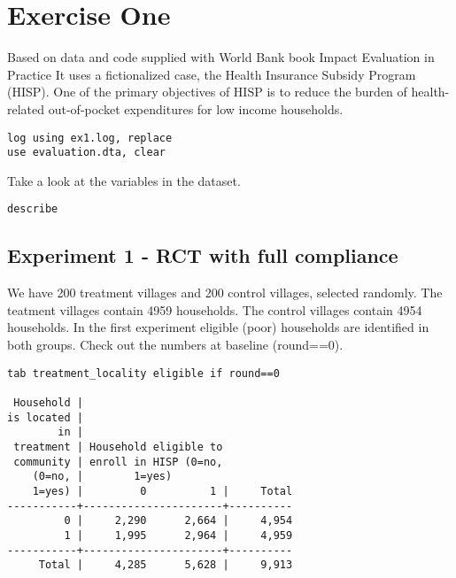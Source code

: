 \documentclass[12pt]{article}
\date{9 March 2024}
\begin{document}
\maketitle




\tableofcontents

\newpage
\section{Exercise One}
Based on data and code supplied with World Bank book Impact Evaluation in Practice It uses a fictionalized case, the Health Insurance Subsidy Program (HISP). One of the primary objectives of HISP is to reduce the burden of health-related  out-of-pocket expenditures for low income households.

\begin{verbatim}
log using ex1.log, replace
use evaluation.dta, clear
\end{verbatim}

Take a look at the variables in the dataset. 
\begin{verbatim}
describe

\end{verbatim}

\subsection{Experiment 1 - RCT with full compliance} 
We have 200 treatment villages and 200 control villages, selected randomly. The teatment villages contain 4959 households. The control villages contain 4954 households. In the first experiment eligible (poor) households are identified in both groups. Check out the numbers at baseline (round==0). 

\begin{verbatim}
tab treatment_locality eligible if round==0

 Household |
is located |
        in |
 treatment | Household eligible to
 community | enroll in HISP (0=no,
    (0=no, |        1=yes)
    1=yes) |         0          1 |     Total
-----------+----------------------+----------
         0 |     2,290      2,664 |     4,954 
         1 |     1,995      2,964 |     4,959 
-----------+----------------------+----------
     Total |     4,285      5,628 |     9,913 

\end{verbatim}
\end{document}

